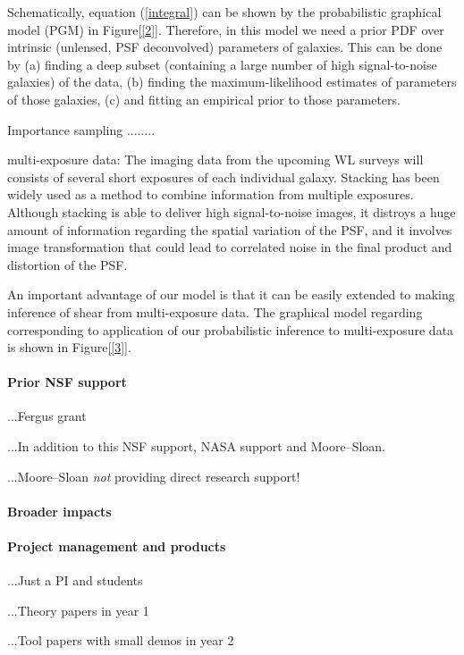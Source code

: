 \documentclass[12pt]{article}
\begin{document}
Schematically, equation (\ref{integral}) can be shown by the probabilistic
graphical model (PGM) in Figure[\ref{2}]. Therefore, in this model we need
a prior PDF over intrinsic (unlensed, PSF deconvolved) parameters of galaxies.
This can be done by (a) finding a deep subset (containing a large number of high
signal-to-noise galaxies) of the data, (b) finding the maximum-likelihood estimates
of parameters of those galaxies, (c) and fitting an empirical prior to those parameters. 

Importance sampling ........

multi-exposure data:
The imaging data from the upcoming WL surveys will consists of several
short exposures of each individual galaxy. Stacking has been widely used
as a method to combine information from multiple exposures. 
Although stacking is able to deliver high signal-to-noise images, it distroys a
huge amount of information regarding the spatial variation of
the PSF, and it involves image transformation that could lead to correlated noise
in the final product and distortion of the PSF.

An important advantage of our model is that it can be easily extended
to making inference of shear from multi-exposure data. The graphical model 
regarding corresponding to application of our probabilistic inference to
multi-exposure data is shown in Figure[\ref{3}].

\paragraph{Prior NSF support}

...Fergus grant

...In addition to this NSF support, NASA support and Moore--Sloan.

...Moore--Sloan \emph{not} providing direct research support!

\paragraph{Broader impacts}

\paragraph{Project management and products}

...Just a PI and students

...Theory papers in year 1

...Tool papers with small demos in year 2
\end{document}
